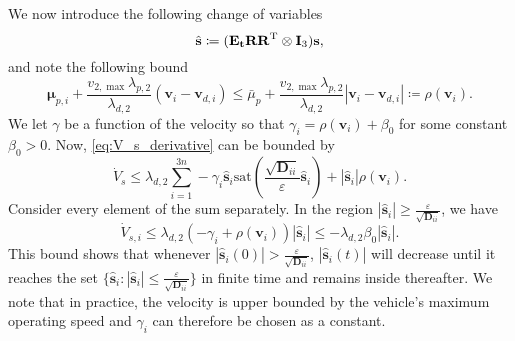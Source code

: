     
    
    We now introduce the following change of variables
    \begin{equation}
        \hat{\mathbf{s}} \coloneqq (\mathbf{E_t R R}^{\rm T} \otimes \mathbf{I}_3)\mathbf{s},
    \end{equation}
    and note the following bound
    \begin{equation}
        \bm{\mu}_{p,i} + \frac{v_{2,\max}\lambda_{p,2}}{\lambda_{d,2}}
            (\mathbf{v}_i-\mathbf{v}_{d,i}) \leq \bar{\mu}_p + \frac{v_{2,\max}\lambda_{p,2}}{\lambda_{d,2}}|\mathbf{v}_i-\mathbf{v}_{d,i}| \coloneqq \rho(\mathbf{v}_i).
    \end{equation}
    We let $\gamma$ be a function of the velocity so that $\gamma_i = \rho(\mathbf{v}_i) + \beta_0$ for some constant $\beta_0 > 0$. Now, \eqref{eq:V_s_derivative} can be bounded by
    \begin{equation}
        \dot{V}_s \leq \lambda_{d,2}\sum_{i=1}^{3n} -\gamma_i \hat{\mathbf{s}}_i \mathrm{sat}(\frac{\sqrt{\mathbf{D}_{ii}}}{\varepsilon} \hat{\mathbf{s}}_i) + |\hat{\mathbf{s}}_i|\rho(\mathbf{v}_i).
    \end{equation}
    Consider every element of the sum separately. In the region $|\hat{\mathbf{s}}_i| \geq \frac{\varepsilon}{\sqrt{\mathbf{D}_{ii}}}$, we have
    \begin{equation}\label{eq:sliding_lyapunov_derivative}
        \dot{V}_{s,i} \leq \lambda_{d,2} (-\gamma_i + \rho(\mathbf{v}_i))|\hat{\mathbf{s}}_i| \leq -\lambda_{d,2}\beta_0|\hat{\mathbf{s}}_i|.
    \end{equation}
    This bound shows that whenever $|\hat{\mathbf{s}}_i (0)| > \frac{\varepsilon}{\sqrt{\mathbf{D}_{ii}}}$, $|\hat{\mathbf{s}}_i (t)| $ will decrease until it reaches the set $\{\hat{\mathbf{s}}_i \colon |\hat{\mathbf{s}}_i| \leq \frac{\varepsilon}{\sqrt{\mathbf{D}_{ii}}}\}$ in finite time and remains inside thereafter. We note that in practice, the velocity is upper bounded by the vehicle's maximum operating speed and $\gamma_i$ can therefore be chosen as a constant.

